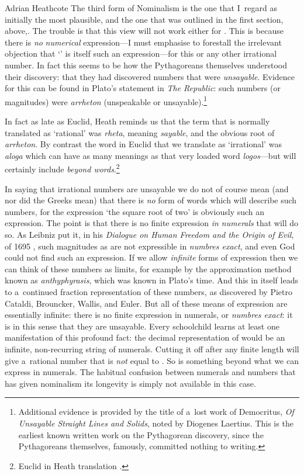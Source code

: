 \begin{artengenv}{Adrian Heathcote}
The third form of Nominalism is the one that I~regard as initially the most plausible, and the one that was outlined in the first section, above,. The trouble is that this view will not work either for \sqrtwo. This is because there is \textit{no} \textit{numerical} expression---I must emphasise  to forestall the irrelevant objection that `\sqrtwo' is itself such an expression---for this or any other irrational number. In fact this seems to be how the Pythagoreans themselves understood their discovery: that they had discovered numbers that were \textit{unsayable}. Evidence for this can be found in Plato's statement in \textit{The Republic}: such numbers (or magnitudes) were \textit{arrheton} (unspeakable or unsayable).\footnote{Additional evidence is provided by the title of a~lost work of Democritus, \textit{Of Unsayable Straight Lines and Solids}, noted by Diogenes Laertius. This is the earliest known written work on the Pythagorean discovery, since the Pythagoreans themselves, famously, committed nothing to writing.}


In fact as late as Euclid, Heath reminds us that the term that is normally translated as `rational' was \emph{rheta}, meaning \textit{sayable}, and the obvious root of \textit{arrheton}. By contrast the word in Euclid that we translate as `irrational' was \emph{aloga} which can have as many meanings as that very loaded word \textit{logos}---but will certainly include \textit{beyond words}.\footnote{Euclid in Heath translation \parencite{euclid_thirteen_1956}.}

In saying that irrational numbers are unsayable we do not of course mean (and nor did the Greeks mean) that there is \textit{no} form of words which will describe such numbers, for the expression `the square root of two' is obviously such an expression. The point is that there is no finite expression \textit{in numerals} that will do so. As Leibniz put it, in his \textit{Dialogue on Human Freedom and the Origin of Evil}, of 1695 \parencite{leibniz_dialogue_1989}, such magnitudes as \sqrtwo are not expressible in \textit{numbres exact}, and even God could not find such an expression. If we allow \textit{infinite} forms of expression then we can think of these numbers as limits, for example by the approximation method known as \textit{anthyphyrasis}, which was known in Plato's time. And this in itself leads to a~continued fraction representation of these numbers, as discovered by Pietro Cataldi, Brouncker, Wallis, and Euler. But all of these means of expression are essentially infinite: there is no finite expression in numerals, or \textit{numbres exact}: it is in this sense that they are unsayable. Every schoolchild learns at least one manifestation of this profound fact: the decimal representation of \sqrtwo would be an infinite, non-recurring string of numerals. Cutting it off after any finite length will give a~rational number that is \textit{not} equal to \sqrtwo. So \sqrtwo is something beyond what we can express in numerals. The habitual confusion between numerals and numbers that has given nominalism its longevity is simply not available in this case.


\end{artengenv}
